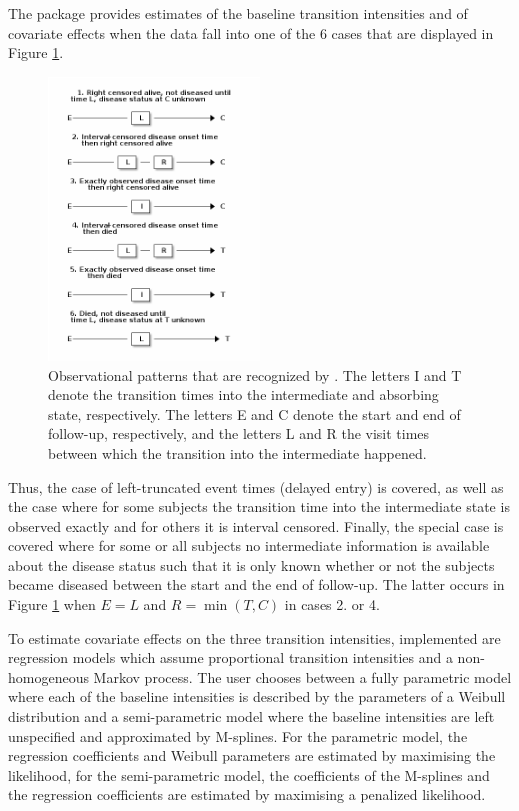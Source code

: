 \documentclass[article]{jss}
\begin{document}
The  package provides estimates of the baseline transition
intensities and of covariate effects when the data fall into one of
the 6 cases that are displayed in Figure \ref{fig:0}.
\begin{figure}[htb]
\centering
\includegraphics[width=0.5\textwidth]{obs-patterns.png}
\caption{\label{fig:0}Observational patterns that are recognized by . The letters I and T denote the transition times into the intermediate and absorbing state, respectively. The letters E and C denote the start and end of follow-up, respectively, and the letters L and R the visit times between which the transition into the intermediate happened.}
\end{figure}
Thus, the case of left-truncated event times
(delayed entry) is covered, as well as the case where for some
subjects the transition time into the intermediate state is observed
exactly and for others it is interval censored.  Finally, the special
case is covered where for some or all subjects no intermediate
information is available about the disease status such that it is only
known whether or not the subjects became diseased between the start
and the end of follow-up. The latter occurs in Figure \ref{fig:0} when
\(E=L\) and \(R=\min(T,C)\) in cases 2. or 4.

To estimate covariate effects on the three transition intensities,
implemented are regression models which assume proportional transition
intensities and a non-homogeneous Markov process. The user chooses
between a fully parametric model where each of the baseline
intensities is described by the parameters of a Weibull distribution
and a semi-parametric model where the baseline intensities are left
unspecified and approximated by M-splines. For the parametric model,
the regression coefficients and Weibull parameters are estimated by
maximising the likelihood, for the semi-parametric model, the
coefficients of the M-splines and the regression coefficients are
estimated by maximising a penalized likelihood.
\end{document}
